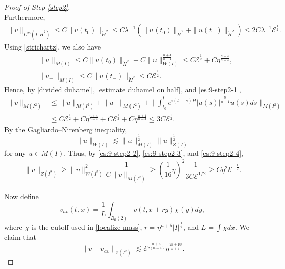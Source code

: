 \documentclass[11pt,a4paper]{article}
\numberwithin{equation}{section}
\begin{document}
\begin{proof}[Proof of Step \ref{step2}]
\begin{equation}
\end{equation}
Furthermore,
\begin{equation}\label{es:9-step2-0}
\begin{aligned}
\|v\|_{L^{\infty}(I, \dot{H}^{2})}
\leq C\|v(t_{0})\|_{\dot{H}^{2}}
\leq C\lambda^{-1}\left( \|u(t_{0})\|_{\dot{H}^{2}} + \|u(t_{-})\|_{\dot{H}^{2}}\right)
\leq 2C\lambda^{-1}\mathcal{E}^{\frac{1}{2}}.
\end{aligned}
\end{equation}
Using \eqref{strichartz}, we also have
\begin{equation}\label{es:9-step2-1}
\begin{aligned}
&\|u\|_{M(I)} \leq C\|u(t_{0})\|_{ \dot{H}^{2}} + C\|u\|_{W(I)}^{\frac{n+4}{n-4}} \leq C\mathcal{E}^{\frac{1}{2}} + C\eta^{\frac{n+4}{n-4}}, \\
&\|u_{-}\|_{M(I)} \leq C\|u(t_{-})\|_{ \dot{H}^{2}} \leq C\mathcal{E}^{\frac{1}{2}}.
\end{aligned}
\end{equation}
Hence, by \eqref{divided duhamel}, \eqref{estimate duhamel on half}, and \eqref{es:9-step2-1},
\begin{equation}\label{es:9-step2-3}
\begin{aligned}
\|v\|_{M(I^{2})}
&\leq \|u\|_{M(I^{2})} + \|u_{-}\|_{M(I^{2})} + \|\int_{t_{0}}^{t} e^{i(t-s)H}|u(s)|^{\frac{8}{n-4}}u(s)ds\|_{M(I^{2})} \\
&\leq C\mathcal{E}^{\frac{1}{2}} + C\eta^{\frac{n+4}{n-4}} + C\mathcal{E}^{\frac{1}{2}} +  C\eta^{\frac{n+4}{n-4}}
\leq 3C\mathcal{E}^{\frac{1}{2}}.
\end{aligned}
\end{equation}
By the Gagliardo--Nirenberg inequality,
\begin{equation}\label{es:9-step2-4}
\|u\|_{W(I)} \lesssim \|u\|_{M(I)}^{\frac{1}{2}}\|u\|_{Z(I)}^{\frac{1}{2}}
\end{equation}
for any $u \in M(I)$. Thus, by \eqref{es:9-step2-2}, \eqref{es:9-step2-3}, and \eqref{es:9-step2-4},
\begin{equation}\label{v is small in z}
\begin{aligned}
\|v\|_{Z(I^{2})}
\geq \|v\|_{W(I^{2})}^{2}\dfrac{1}{C\|v\|_{M(I^{2})}}
\geq \left(\dfrac{1}{16}\eta\right)^{2}\dfrac{1}{3C\mathcal{E}^{1/2}}
\geq C\eta^{2}\mathcal{E}^{-\frac{1}{2}}.
\end{aligned}
\end{equation}

Now define
\begin{equation}\label{df:v_av}
v_{av}(t,x) = \dfrac{1}{L}\int_{B_{0}(2)} v(t, x+ry)\chi (y) dy,
\end{equation}
where $\chi$ is the cutoff used in \eqref{localize mass}, $r = \eta^{n + 5}|I|^{\frac{1}{4}}$, and $L = \int \chi dx$.
We claim that
\begin{equation}\label{additional regurality}
\|v - v_{av}\|_{Z(I^{2})} \lesssim \mathcal{E}^{\frac{n+4}{2(n-4)}}\eta^{\frac{2n + 10}{n + 4}}.
\end{equation}


\end{proof}
\end{document}
